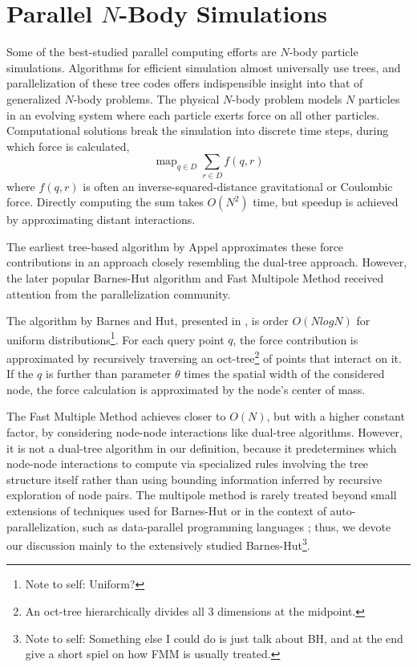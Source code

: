 \documentclass[times, leqno,twocolumn]{article}
\newcommand{\authornote}[1]{\footnote{Note to self: #1}}
\DeclareMathOperator*{\map}{map}
\begin{document}
\section{Parallel $N$-Body Simulations}

Some of the best-studied parallel computing efforts are $N$-body particle simulations.
Algorithms for efficient simulation almost universally use trees, and parallelization of these tree codes offers indispensible insight into that of generalized $N$-body problems.
The physical $N$-body problem models $N$ particles in an evolving system where each particle exerts force on all other particles.
Computational solutions break the simulation into discrete time steps, during which force is calculated,
\[\map_{q \in D} \sum_{r \in D} f(q,r)\]
\noindent where $f(q,r)$ is often an inverse-squared-distance gravitational or Coulombic force.
Directly computing the sum takes $O(N^2)$ time, but speedup is achieved by approximating distant interactions.

The earliest tree-based algorithm by Appel \cite{appel_alg} approximates these force contributions in an approach closely resembling the dual-tree approach.
However, the later popular Barnes-Hut algorithm\cite{barnes_hut} and Fast Multipole Method\cite{greengard_fmm} received attention from the parallelization community.

The algorithm by Barnes and Hut, presented in \cite{barnes_hut}, is order $O(N log N)$ for uniform distributions\authornote{Uniform?}.
For each query point $q$, the force contribution is approximated by recursively traversing an oct-tree\footnote{An oct-tree hierarchically divides all 3 dimensions at the midpoint.} of points that interact on it.
If the $q$ is further than parameter $\theta$ times the spatial width of the considered node, the force calculation is approximated by the node's center of mass.

The Fast Multiple Method \cite{greengard_fmm} achieves closer to $O(N)$, but with a higher constant factor, by considering node-node interactions like dual-tree algorithms.
However, it is not a dual-tree algorithm in our definition, because it predetermines which node-node interactions to compute via specialized rules involving the tree structure itself rather than using bounding information inferred by recursive exploration of node pairs.
The multipole method is rarely treated beyond small extensions of techniques used for Barnes-Hut \cite{singh95load} or in the context of auto-parallelization, such as data-parallel programming languages \cite{nyland93dataparallel} \cite{washington_nesl}; thus, we devote our discussion mainly to the extensively studied Barnes-Hut\authornote{Something else I could do is just talk about BH, and at the end give a short spiel on how FMM is usually treated.}.
\end{document}
